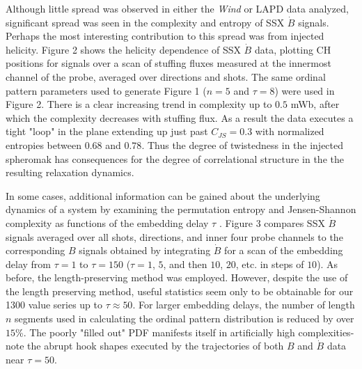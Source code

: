 \documentclass[aps,pre,twocolumn,secnumarabic,nobalancelastpage,amsmath,amssymb,
nofootinbib]{revtex4-1}
\begin{document}


Although little spread was observed in either the \textit{Wind} or LAPD data analyzed, significant spread was seen in the complexity and entropy of SSX $\dot{B}$ signals. Perhaps the most interesting contribution to this spread was from injected helicity.  Figure 2 shows the helicity dependence of SSX $\dot{B}$ data, plotting CH positions for signals over a scan of stuffing fluxes measured at the innermost channel of the probe, averaged over directions and shots. The same ordinal pattern parameters used to generate Figure 1 ($n=5$ and $\tau=8$) were used in Figure 2. There is a clear increasing trend in complexity up to $0.5$ mWb, after which the complexity decreases with stuffing flux. As a result the data executes a tight "loop" in the plane extending up just past $C_{JS}=0.3$ with normalized entropies between $0.68$ and $0.78$. Thus the degree of twistedness in the injected spheromak has consequences for the degree of correlational structure in the the resulting relaxation dynamics.

In some cases, additional information can be gained about the underlying dynamics of a system by examining the permutation entropy and Jensen-Shannon complexity as functions of the embedding delay $\tau$ \cite{zunino2012}. Figure 3 compares SSX $\dot{B}$ signals averaged over all shots, directions, and inner four probe channels to the corresponding $B$ signals obtained by integrating $\dot{B}$ for a scan of the embedding delay from $\tau=1$ to $\tau=150$ ($\tau=1$, $5$, and then $10$, $20$, etc. in steps of $10$). As before, the length-preserving method was employed. However, despite the use of the length preserving method, useful statistics seem only to be obtainable for our 1300 value series up to $\tau \approx 50$. For larger embedding delays, the number of length $n$ segments used in calculating the ordinal pattern distribution is reduced by over $15$\%. The poorly "filled out" PDF manifests itself in artificially high complexities-  note the abrupt hook shapes executed by the trajectories of both $B$ and $\dot{B}$ data near $\tau=50$. 
\end{document}

